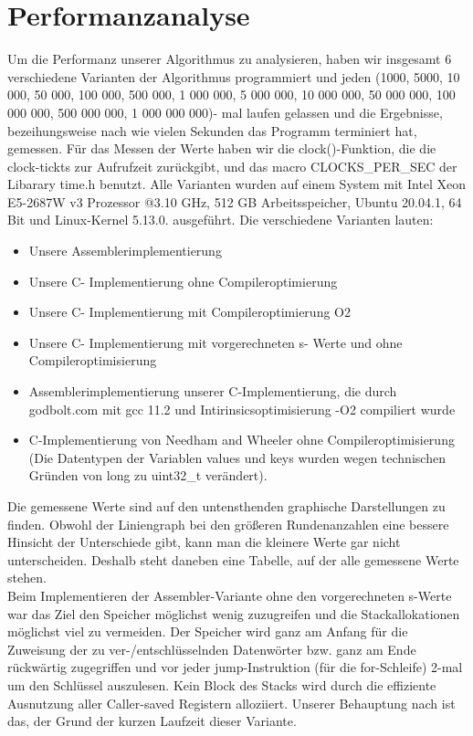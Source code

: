 \documentclass[course=asp]{aspdoc}
\begin{document}
\section{Performanzanalyse}
Um die Performanz unserer Algorithmus zu analysieren, haben wir insgesamt 6 verschiedene Varianten der Algorithmus programmiert und jeden (1000, 5000, 10 000, 50 000, 100 000, 500 000, 1 000 000, 5 000 000, 10 000 000, 50 000 000, 100 000 000, 500 000 000, 1 000 000 000)- mal laufen gelassen und die Ergebnisse, bezeihungsweise nach wie vielen Sekunden das Programm terminiert hat, gemessen. Für das Messen der Werte haben wir die clock()-Funktion, die die clock-tickts zur Aufrufzeit zurückgibt, und das macro CLOCKS\_PER\_SEC der Libarary time.h benutzt. Alle Varianten wurden auf einem System mit Intel Xeon E5-2687W v3 Prozessor @3.10 GHz, 512 GB Arbeitsspeicher, Ubuntu 20.04.1, 64 Bit und Linux-Kernel 5.13.0. ausgeführt. Die verschiedene Varianten lauten:
\begin{itemize}
\item Unsere Assemblerimplementierung
\item Unsere C- Implementierung ohne Compileroptimierung
\item Unsere C- Implementierung mit Compileroptimierung O2
\item Unsere C- Implementierung mit vorgerechneten s- Werte und ohne Compileroptimisierung
\item Assemblerimplementierung unserer C-Implementierung, die durch godbolt.com mit gcc 11.2 und Intirinsicsoptimisierung -O2 compiliert wurde
\item C-Implementierung von Needham and Wheeler ohne Compileroptimisierung (Die Datentypen der Variablen values und keys wurden wegen technischen Gründen von long zu uint32\_t verändert).
\end{itemize}
Die gemessene Werte sind auf den untensthenden graphische Darstellungen zu finden. Obwohl der Liniengraph bei den größeren Rundenanzahlen eine bessere Hinsicht der Unterschiede gibt, kann man die kleinere Werte gar nicht unterscheiden. Deshalb steht daneben eine Tabelle, auf der alle gemessene Werte stehen.\\
Beim Implementieren der Assembler-Variante ohne den vorgerechneten s-Werte war das Ziel den Speicher möglichst wenig
zuzugreifen und die Stackallokationen möglichst viel zu vermeiden. Der Speicher wird ganz am Anfang für die
Zuweisung der zu ver-/entschlüsselnden Datenwörter bzw. ganz am Ende rückwärtig zugegriffen und vor jeder
jump-Instruktion (für die for-Schleife) 2-mal um den Schlüssel auszulesen. Kein Block des Stacks wird durch
die effiziente Ausnutzung aller Caller-saved Registern alloziiert. Unserer Behauptung nach ist das, der Grund der
kurzen Laufzeit dieser Variante.
\end{document}
